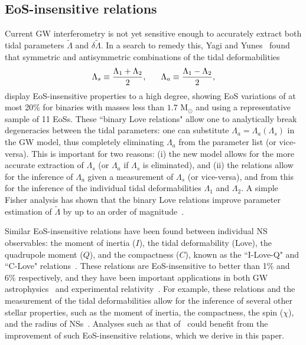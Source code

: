 \documentclass[prd,twocolumn,nofootinbib,superscriptaddress,amsmath,amssymb]{revtex4-1}
\begin{document}
\subsection{EoS-insensitive relations}\label{sec:eosInsensitive}
Current GW interferometry is not yet sensitive enough to accurately extract both tidal parameters $\tilde{\Lambda}$ and $\delta\tilde{\Lambda}$.
In a search to remedy this, Yagi and Yunes~\cite{Yagi:binLove} found that symmetric and antisymmetric combinations of the tidal deformabilities
\begin{equation}
\Lambda_s \equiv \frac{\Lambda_1 + \Lambda_2}{2}, \hspace{6mm} \Lambda_a \equiv \frac{\Lambda_1 - \Lambda_2}{2},
\end{equation}
display EoS-insensitive properties to a high degree, showing EoS variations of at most 20\% for binaries with masses less than $1.7 \text{ M}_{\odot}$ and using a representative sample of 11 EoSs. 
These ``binary Love relations" allow one to analytically break degeneracies between the tidal parameters: one can substitute $\Lambda_{a}=\Lambda_{a}(\Lambda_{s})$ in the GW model, thus completely eliminating $\Lambda_{a}$ from the parameter list (or vice-versa). This is important for two reasons: (i) the new model allows for the more accurate extraction of $\Lambda_{s}$ (or $\Lambda_{a}$ if $\Lambda_{s}$ is eliminated), and (ii) the relations allow for the inference of $\Lambda_{a}$ given a measurement of $\Lambda_{s}$ (or vice-versa), and from this for the inference of the individual tidal deformabilities $\Lambda_{1}$ and $\Lambda_{2}$. A simple Fisher analysis has shown that the binary Love relations improve parameter estimation of $\tilde{\Lambda}$ by up to an order of magnitude~\cite{Yagi:2015pkc,Yagi:binLove}.

Similar EoS-insensitive relations have been found between individual NS observables: the moment of inertia ($I$), the tidal deformability (Love), the quadrupole moment ($Q$), and the compactness ($C$), known as the ``I-Love-Q" and ``C-Love" relations~\cite{Yagi:2013bca,Yagi:ILQ, Maselli:2013mva}.
These relations are EoS-insensitive to better than 1\% and 6\% respectively, and they have been important applications in both GW astrophysics~\cite{Kumar:2019xgp} and experimental relativity~\cite{Yagi:2013bca,Yagi:ILQ,Gupta:2017vsl,Doneva:2017jop}. For example, these relations and the measurement of the tidal deformabilities allow for the inference of several other stellar properties, such as the moment of inertia, the  compactness, the spin ($\chi$), and the radius of NSs~\cite{Kumar:2019xgp}.
Analyses such as that of~\cite{Kumar:2019xgp} could benefit from the improvement of such EoS-insensitive relations, which we derive in this paper. 
\end{document}
